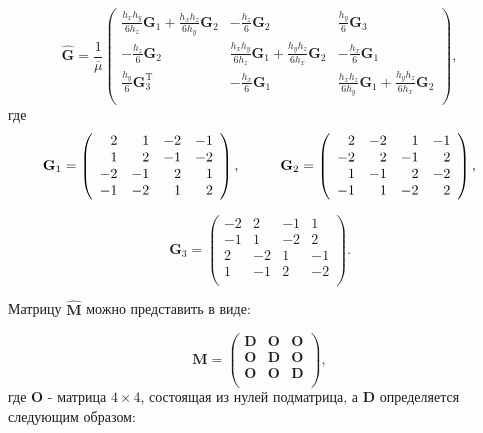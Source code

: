 \begin{equation*}
	\hat{\textbf{G}} = \frac{1}{\overline{\mu}} \left(
	\begin{array}{ccc}
		\frac{h_x h_y}{6h_z}\textbf{G}_1 + \frac{h_x h_z}{6h_y}\textbf{G}_2 & -\frac{h_z}{6}\textbf{G}_2 & \frac{h_y}{6}\textbf{G}_3 \\
		-\frac{h_z}{6}\textbf{G}_2 & \frac{h_x h_y}{6h_z}\textbf{G}_1 + \frac{h_y h_z}{6h_x}\textbf{G}_2 & -\frac{h_x}{6}\textbf{G}_1 \\
		\frac{h_y}{6}\textbf{G}^\text{T}_3 & -\frac{h_x}{6}\textbf{G}_1 & \frac{h_x h_z}{6h_y}\textbf{G}_1 + \frac{h_y h_z}{6h_x}\textbf{G}_2 \\
	\end{array}
	\right),
\end{equation*}
где
\begin{equation*}
	\textbf{G}_1 = \left(
	\begin{array}{rrrr}
		2 & 1 & -2 & -1 \\
		1 & 2 & -1 & -2 \\
		-2 & -1 & 2 & 1 \\
		-1 & -2 & 1 & 2 \\
	\end{array}
	\right),
	\hspace{10mm}
	\textbf{G}_2 = \left(
	\begin{array}{rrrr}
		2 & -2 & 1 & -1 \\
		-2 & 2 & -1 & 2 \\
		1 & -1 & 2 & -2 \\
		-1 & 1 & -2 & 2 \\
	\end{array}
	\right),
\end{equation*}

\begin{equation*}
	\textbf{G}_3 = \left(
	\begin{array}{rrrr}
		-2 & 2 & -1 & 1 \\
		-1 & 1 & -2 & 2 \\
		2 & -2 & 1 & -1 \\
		1 & -1 & 2 & -2 \\
	\end{array}
	\right).
\end{equation*}

Матрицу $\hat{\textbf{M}}$ можно представить в виде:

\begin{equation*}
	\textbf{M} = \left(
	\begin{array}{ccc}
		\textbf{D} & \textbf{O} & \textbf{O}\\
		\textbf{O} & \textbf{D} & \textbf{O}\\
		\textbf{O} & \textbf{O} & \textbf{D} \\
	\end{array}
	\right) ,
\end{equation*}
где $\textbf{O}$ - матрица $4 \times 4$, состоящая из нулей подматрица, а $\textbf{D}$ определяется следующим образом:

